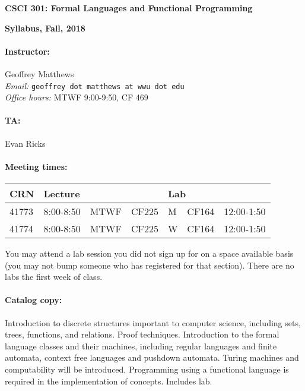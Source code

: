 \documentclass{article}
\begin{document}
\centerline{\Large\bf CSCI 301: Formal Languages and Functional Programming}
\centerline{\large\bf Syllabus, Fall, 2018}

\paragraph{Instructor:} Geoffrey Matthews\\
{\em Email:} {\tt geoffrey dot matthews at wwu dot edu}\\
{\em Office hours:} MTWF 9:00-9:50, CF 469

\paragraph{TA:} Evan Ricks

\paragraph{Meeting times:} \mbox{}

  \begin{tabular}{l|lll|lll}
    CRN & \multicolumn{3}{l|}{Lecture}
    & \multicolumn{3}{|l}{Lab}
    \\\hline
    41773 & 8:00-8:50& MTWF & CF225 &  M & CF164 & 12:00-1:50
    \\
    41774 & 8:00-8:50& MTWF & CF225 &  W & CF164 & 12:00-1:50 
    \\\hline
    \end{tabular}
	
  You may attend a lab session you did not sign up for on a space
  available basis (you may not bump someone who has registered for
  that section).  There are no labs the first week of class.

\paragraph{Catalog copy:} Introduction to discrete structures important to
  computer science, including sets, trees, functions, and
  relations. Proof techniques. Introduction to the formal language
  classes and their machines, including regular languages and finite
  automata, context free languages and pushdown automata. Turing
  machines and computability will be introduced. Programming using a
  functional language is required in the implementation of
  concepts. Includes lab.
\end{document}
